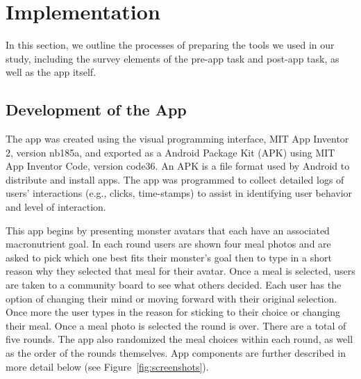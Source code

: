 \vspace{-5pt}
\section{Implementation}
In this section, we outline the processes of preparing the tools we used in our study, including the survey elements of the pre-app task and post-app task, as well as the app itself.
\vspace{-5pt}
\subsection{Development of the App}
The app was created using the visual programming interface, MIT App Inventor 2, version nb185a, and exported as a Android Package Kit (APK) using MIT App Inventor Code, version code36. An APK is a file format used by Android to distribute and install apps. The app was programmed to collect detailed logs of users' interactions (e.g., clicks, time-stamps) to assist in identifying user behavior and level of interaction. 


This app begins by presenting monster avatars that each have an associated macronutrient goal. In each round users are shown four meal photos and are asked to pick which one best fits their monster's goal then to type in a short reason why they selected that meal for their avatar. Once a meal is selected, users are taken to a community board to see what others decided. Each user has the option of changing their mind or moving forward with their original selection. Once more the user types in the reason for sticking to their choice or changing their meal. Once a meal photo is selected the round is over. There are a total of five rounds. The app also randomized the meal choices within each round, as well as the order of the rounds themselves. App components are further described in more detail below (see Figure~\ref{fig:screenshots}).



